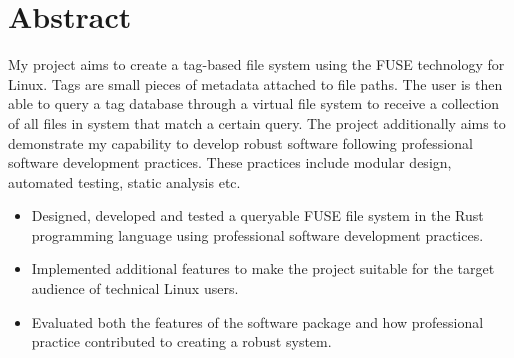\chapter*{Abstract}
\vspace{1cm}

\noindent
My project aims to create a tag-based file system using the FUSE technology for
Linux. Tags are small pieces of metadata attached to file paths. The user is
then able to query a tag database through a virtual file system to receive a
collection of all files in system that match a certain query. The project
additionally aims to demonstrate my capability to develop robust software
following professional software development practices. These practices include
modular design, automated testing, static analysis etc.

\begin{itemize}
    \item Designed, developed and tested a queryable FUSE file system in the
        Rust programming language using professional software development
        practices.
    \item Implemented additional features to make the project suitable for the
        target audience of technical Linux users.
    \item Evaluated both the features of the software package and how
        professional practice contributed to creating a robust system.
\end{itemize}
